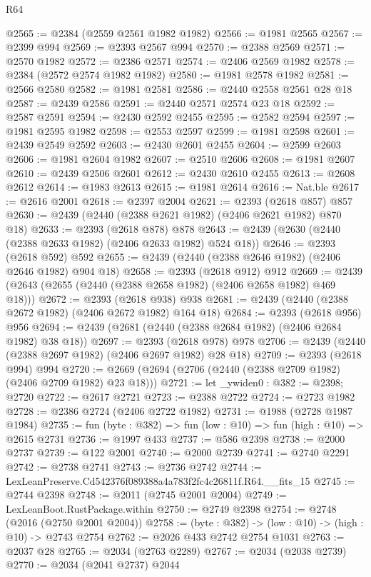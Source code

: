 \begin{lexlean}{R64}
\begin{coremodule}
@2565 := @2384 (@2559 @2561 @1982 @1982)
@2566 := @1981 @2565
@2567 := @2399 @994
@2569 := @2393 @2567 @994
@2570 := @2388 @2569
@2571 := @2570 @1982
@2572 := @2386 @2571
@2574 := @2406 @2569 @1982
@2578 := @2384 (@2572 @2574 @1982 @1982)
@2580 := @1981 @2578 @1982
@2581 := @2566 @2580
@2582 := @1981 @2581
@2586 := @2440 @2558 @2561 @28 @18
@2587 := @2439 @2586
@2591 := @2440 @2571 @2574 @23 @18
@2592 := @2587 @2591
@2594 := @2430 @2592 @2455
@2595 := @2582 @2594
@2597 := @1981 @2595 @1982
@2598 := @2553 @2597
@2599 := @1981 @2598
@2601 := @2439 @2549 @2592
@2603 := @2430 @2601 @2455
@2604 := @2599 @2603
@2606 := @1981 @2604 @1982
@2607 := @2510 @2606
@2608 := @1981 @2607
@2610 := @2439 @2506 @2601
@2612 := @2430 @2610 @2455
@2613 := @2608 @2612
@2614 := @1983 @2613
@2615 := @1981 @2614
@2616 := Nat.ble
@2617 := @2616 @2001
@2618 := @2397 @2004
@2621 := @2393 (@2618 @857) @857
@2630 := @2439 (@2440 (@2388 @2621 @1982) (@2406 @2621 @1982) @870 @18)
@2633 := @2393 (@2618 @878) @878
@2643 := @2439 (@2630 (@2440 (@2388 @2633 @1982) (@2406 @2633 @1982) @524 @18))
@2646 := @2393 (@2618 @592) @592
@2655 := @2439 (@2440 (@2388 @2646 @1982) (@2406 @2646 @1982) @904 @18)
@2658 := @2393 (@2618 @912) @912
@2669 := @2439 (@2643 (@2655 (@2440 (@2388 @2658 @1982) (@2406 @2658 @1982) @469 @18)))
@2672 := @2393 (@2618 @938) @938
@2681 := @2439 (@2440 (@2388 @2672 @1982) (@2406 @2672 @1982) @164 @18)
@2684 := @2393 (@2618 @956) @956
@2694 := @2439 (@2681 (@2440 (@2388 @2684 @1982) (@2406 @2684 @1982) @38 @18))
@2697 := @2393 (@2618 @978) @978
@2706 := @2439 (@2440 (@2388 @2697 @1982) (@2406 @2697 @1982) @28 @18)
@2709 := @2393 (@2618 @994) @994
@2720 := @2669 (@2694 (@2706 (@2440 (@2388 @2709 @1982) (@2406 @2709 @1982) @23 @18)))
@2721 := let _ywiden0 : @382 := @2398; @2720
@2722 := @2617 @2721
@2723 := @2388 @2722
@2724 := @2723 @1982
@2728 := @2386 @2724 (@2406 @2722 @1982)
@2731 := @1988 (@2728 @1987 @1984)
@2735 := fun (byte : @382) => fun (low : @10) => fun (high : @10) => @2615 @2731
@2736 := @1997 @433
@2737 := @586 @2398
@2738 := @2000 @2737
@2739 := @122 @2001
@2740 := @2000 @2739
@2741 := @2740 @2291
@2742 := @2738 @2741
@2743 := @2736 @2742
@2744 := LexLeanPreserve.Cd542376f089388a4a783f2fc4c26811f.R64.__fits_15
@2745 := @2744 @2398
@2748 := @2011 (@2745 @2001 @2004)
@2749 := LexLeanBoot.RustPackage.within
@2750 := @2749 @2398
@2754 := @2748 (@2016 (@2750 @2001 @2004))
@2758 := (byte : @382) -> (low : @10) -> (high : @10) -> @2743 @2754
@2762 := @2026 @433 @2742 @2754 @1031
@2763 := @2037 @28
@2765 := @2034 (@2763 @2289)
@2767 := @2034 (@2038 @2739)
@2770 := @2034 (@2041 @2737) @2044

\end{coremodule}
\end{lexlean}
